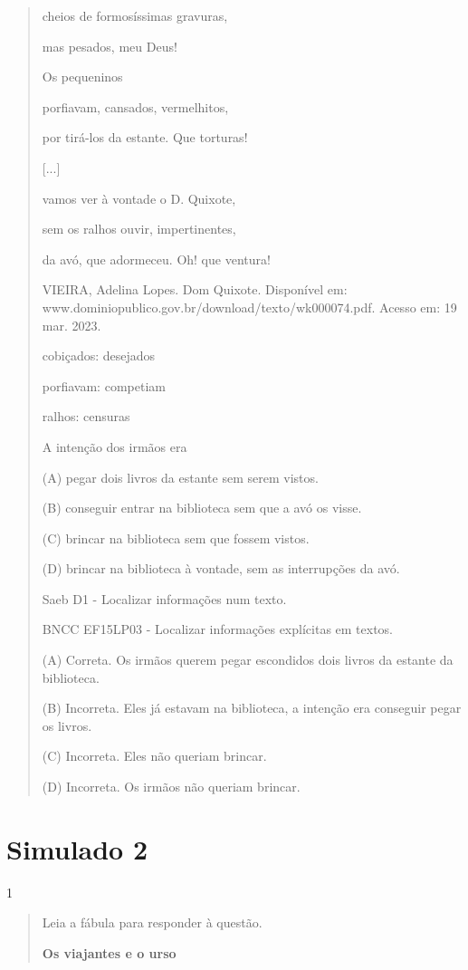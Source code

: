 \begin{itemize}
{{{\begin{itemize}
\begin{itemize}
\begin{itemize}
\begin{quote}
cheios de formosíssimas gravuras,

mas pesados, meu Deus!

Os pequeninos

porfiavam, cansados, vermelhitos,

por tirá-los da estante. Que torturas!

{[}...{]}

vamos ver à vontade o D. Quixote,

sem os ralhos ouvir, impertinentes,

da avó, que adormeceu. Oh! que ventura!

VIEIRA, Adelina Lopes. Dom Quixote. Disponível em:
www.dominiopublico.gov.br/download/texto/wk000074.pdf. Acesso em: 19
mar. 2023.

cobiçados: desejados

porfiavam: competiam

ralhos: censuras

A intenção dos irmãos era

(A) pegar dois livros da estante sem serem vistos.

(B) conseguir entrar na biblioteca sem que a avó os visse.

(C) brincar na biblioteca sem que fossem vistos.

(D) brincar na biblioteca à vontade, sem as interrupções da avó.

Saeb D1 - Localizar informações num texto.

BNCC EF15LP03 - Localizar informações explícitas em textos.

(A) Correta. Os irmãos querem pegar escondidos dois livros da estante da
biblioteca.

(B) Incorreta. Eles já estavam na biblioteca, a intenção era conseguir
pegar os livros.

(C) Incorreta. Eles não queriam brincar.

(D) Incorreta. Os irmãos não queriam brincar.
\end{quote}

\chapter{Simulado 2}

\num{1}

\begin{quote}
Leia a fábula para responder à questão.

\textbf{Os viajantes e o urso}


\end{quote}
\end{itemize}
\end{itemize}
\end{itemize}}}}
\end{itemize}
